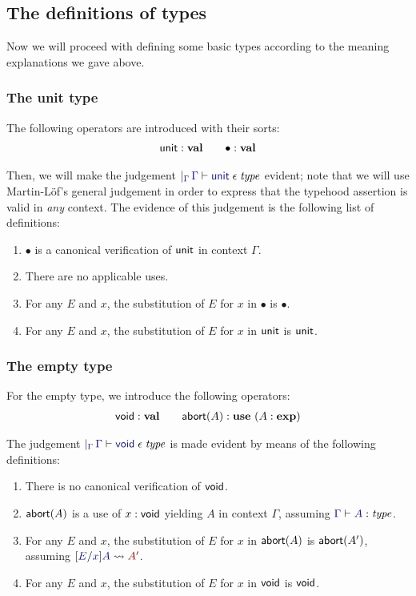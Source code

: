 \documentclass[main.tex]{subfiles}
\begin{document}
\subsection{The definitions of types}

Now we will proceed with defining some basic types according to the
meaning explanations we gave above.

\subsubsection{The unit type}

The following operators are introduced with their sorts:
\begin{gather*}
  \mathsf{unit} : \mathbf{val}\qquad \bullet : \mathbf{val}
\end{gather*}

Then, we will make the judgement
$\genj{\Gamma}{\lfsequent\Gamma\cantype\tyunit}$ evident; note that we will use
Martin-L\"of's general judgement in order to express that the typehood
assertion is valid in \emph{any} context. The evidence of this
judgement is the following list of definitions:
\begin{enumerate}
  \item $\bullet$ is a canonical verification of $\mathsf{unit}$ in context $\Gamma$.
  \item There are no applicable uses.
  \item For any $E$ and $x$, the substitution of $E$ for $x$ in $\bullet$ is $\bullet$.
  \item For any $E$ and $x$, the substitution of $E$ for $x$ in $\mathsf{unit}$ is $\mathsf{unit}$.
\end{enumerate}

\subsubsection{The empty type}
For the empty type, we introduce the following operators:
\begin{gather*}
  \mathsf{void}:\mathbf{val} \qquad \mathsf{abort}(A):\mathbf{use}\ (A:\mathbf{exp})
\end{gather*}

The judgement $\genj{\Gamma}{\lfsequent\Gamma\cantype\tyvoid}$ is made
evident by means of the following definitions:
\begin{enumerate}
  \item There is no canonical verification of $\mathsf{void}$.
  \item $\mathsf{abort}(A)$ is a use of $x:\mathsf{void}$ yielding $A$ in context $\Gamma$, assuming $\lfsequent\Gamma\type{A}$.
  \item For any $E$ and $x$, the substitution of $E$ for $x$ in $\mathsf{abort}(A)$ is $\mathsf{abort}(A')$, assuming $\hsubste{E}{x}{A}{A'}$.
  \item For any $E$ and $x$, the substitution of $E$ for $x$ in $\mathsf{void}$ is $\mathsf{void}$.
\end{enumerate}
\end{document}
